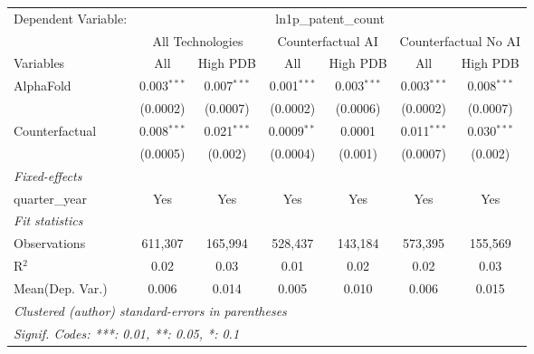 \begingroup
\centering
\begin{tabular}{lcccccc}
   \tabularnewline \midrule \midrule
   Dependent Variable: & \multicolumn{6}{c}{ln1p\_patent\_count}\\
 & \multicolumn{2}{c}{All Technologies} & \multicolumn{2}{c}{Counterfactual AI} & \multicolumn{2}{c}{Counterfactual No AI} \\
\cmidrule(lr){1-1}\cmidrule(lr){2-3} \cmidrule(lr){4-5} \cmidrule(lr){6-7}
Variables & \multicolumn{1}{c}{All} & \multicolumn{1}{c}{High PDB} & \multicolumn{1}{c}{All} & \multicolumn{1}{c}{High PDB} & \multicolumn{1}{c}{All} & \multicolumn{1}{c}{High PDB} \\
\cmidrule(lr){1-1}\cmidrule(lr){2-2} \cmidrule(lr){3-3} \cmidrule(lr){4-4} \cmidrule(lr){5-5} \cmidrule(lr){6-6} \cmidrule(lr){7-7}
   AlphaFold      & 0.003$^{***}$ & 0.007$^{***}$ & 0.001$^{***}$ & 0.003$^{***}$ & 0.003$^{***}$ & 0.008$^{***}$\\   
                  & (0.0002)      & (0.0007)      & (0.0002)      & (0.0006)      & (0.0002)      & (0.0007)\\   
   Counterfactual & 0.008$^{***}$ & 0.021$^{***}$ & 0.0009$^{**}$ & 0.0001        & 0.011$^{***}$ & 0.030$^{***}$\\   
                  & (0.0005)      & (0.002)       & (0.0004)      & (0.001)       & (0.0007)      & (0.002)\\   
   \midrule
   \emph{Fixed-effects}\\
   quarter\_year  & Yes           & Yes           & Yes           & Yes           & Yes           & Yes\\  
   \midrule
   \emph{Fit statistics}\\
   Observations   & 611,307       & 165,994       & 528,437       & 143,184       & 573,395       & 155,569\\  
   R$^2$          & 0.02          & 0.03          & 0.01          & 0.02          & 0.02          & 0.03\\  
Mean(Dep. Var.) & 0.006 & 0.014 & 0.005 & 0.010 & 0.006 & 0.015 \\
   \midrule \midrule
   \multicolumn{7}{l}{\emph{Clustered (author) standard-errors in parentheses}}\\
   \multicolumn{7}{l}{\emph{Signif. Codes: ***: 0.01, **: 0.05, *: 0.1}}\\
\end{tabular}
\par\endgroup
